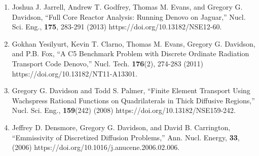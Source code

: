 \documentclass[letterpaper,11pt]{article}
\begin{document}
\begin{enumerate}
    (2014) https://doi.org/10.13182/NSE12-101.
  \item Joshua J. Jarrell, Andrew T. Godfrey, Thomas M. Evans, and
    Gregory G. Davidson, ``Full Core Reactor Analysis: Running Denovo
    on Jaguar,'' Nucl. Sci. Eng., \textbf{175}, 283-291 (2013)
    https://doi.org/10.13182/NSE12-60.
  \item Gokhan Yesilyurt, Kevin T. Clarno, Thomas M. Evans, Gregory
    G. Davidson, and P.B. Fox, ``A C5 Benchmark Problem with Discrete
    Ordinate Radiation Transport Code Denovo,''
    Nucl. Tech. \textbf{176}(2), 274-283 (2011)
    https://doi.org/10.13182/NT11-A13301.
  \item Gregory G. Davidson and Todd S. Palmer, ``Finite Element
    Transport Using Wachspress Rational Functions on Quadrilaterals in
    Thick Diffusive Regions,'' Nucl. Sci. Eng., \textbf{159}(242)
    (2008) https://doi.org/10.13182/NSE159-242.
  \item Jeffrey D. Densmore, Gregory G. Davidson, and David
    B. Carrington, ``Emmissivity of Discretized Diffusion Problems,''
    Ann. Nucl. Energy, \textbf{33}, (2006)
    https://doi.org/10.1016/j.anucene.2006.02.006.
\end{enumerate}

\end{document}
